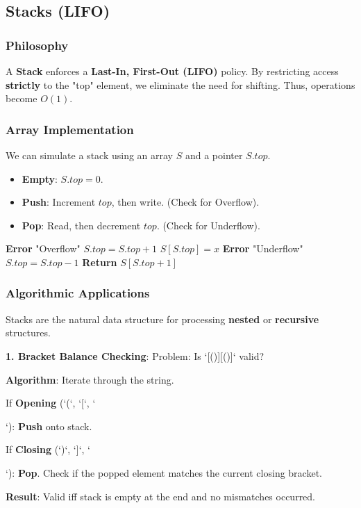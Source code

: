 \documentclass[12pt]{article}
\theoremstyle{blueplain}
\theoremstyle{bluedef}
\theoremstyle{blueremark}
\begin{document}
\subsection{Stacks (LIFO)}

\subsubsection{Philosophy}
A \textbf{Stack} enforces a \textbf{Last-In, First-Out (LIFO)} policy. By restricting access \textbf{strictly} to the "top" element, we eliminate the need for shifting. Thus, operations become $O(1)$.

\subsubsection{Array Implementation}
We can simulate a stack using an array $S$ and a pointer $S.top$.
\begin{itemize}
    \item \textbf{Empty}: $S.top = 0$.
    \item \textbf{Push}: Increment $top$, then write. (Check for Overflow).
    \item \textbf{Pop}: Read, then decrement $top$. (Check for Underflow).
\end{itemize}

\begin{algorithm}
    \caption{Stack Operations}\label{alg:stack}
    \begin{algorithmic}[1]
        \State \textbf{Error} "Overflow"
        \Else
        \State $S.top = S.top + 1$
        \State $S[S.top] = x$
        \EndIf
        \EndProcedure
        \Statex
        \State \textbf{Error} "Underflow"
        \Else
        \State $S.top = S.top - 1$
        \State \textbf{Return} $S[S.top + 1]$
        \EndIf
        \EndProcedure
    \end{algorithmic}
\end{algorithm}

\subsubsection{Algorithmic Applications}
Stacks are the natural data structure for processing \textbf{nested} or \textbf{recursive} structures.

\textbf{1. Bracket Balance Checking}:
Problem: Is `{[()][()]}` valid?
\begin{itemize}
    \item \textbf{Algorithm}: Iterate through the string.
    \item If \textbf{Opening} (`(`, `[`, `{`): \textbf{Push} onto stack.
    \item If \textbf{Closing} (`)`, `]`, `}`): \textbf{Pop}. Check if the popped element matches the current closing bracket.
    \item \textbf{Result}: Valid iff stack is empty at the end and no mismatches occurred.
\end{itemize}
\end{document}
